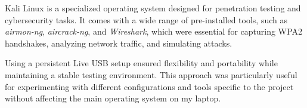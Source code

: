 Kali Linux is a specialized operating system designed for penetration testing and cybersecurity tasks. It comes with a wide range of pre-installed tools, such as \textit{airmon-ng}, \textit{aircrack-ng}, and \textit{Wireshark}, which were essential for capturing WPA2 handshakes, analyzing network traffic, and simulating attacks. 

Using a persistent Live USB setup ensured flexibility and portability while maintaining a stable testing environment. This approach was particularly useful for experimenting with different configurations and tools specific to the project without affecting the main operating system on my laptop.


